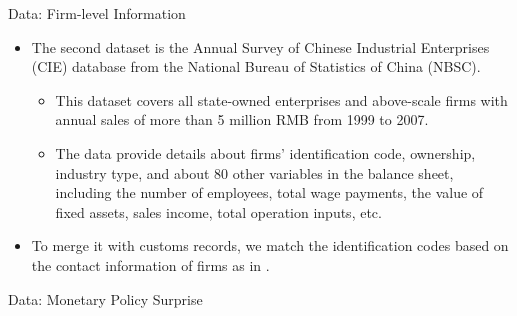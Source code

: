\documentclass[10pt]{beamer}
\begin{document}
\begin{frame}{Data: Firm-level Information}
	\begin{itemize}
		\item The second dataset is the Annual Survey of Chinese Industrial Enterprises (CIE) database from the National Bureau of Statistics of China (NBSC).
		\begin{itemize}
			\item This dataset covers all state-owned enterprises and above-scale firms
			with annual sales of more than 5 million RMB from 1999 to 2007.
			\item The data provide details about firms’ identification code, ownership, industry
			type, and about 80 other variables in the balance sheet, including the number of employees, total wage payments, the value of fixed assets, sales income, total operation inputs, etc.
		\end{itemize}
		\item To merge it with customs records, we match the identification codes based on the contact information of firms as in \cite{fan-li-yeaple2015}.
	\end{itemize}
\end{frame}

\begin{frame}{Data: Monetary Policy Surprise}

\end{frame}
\end{document}
